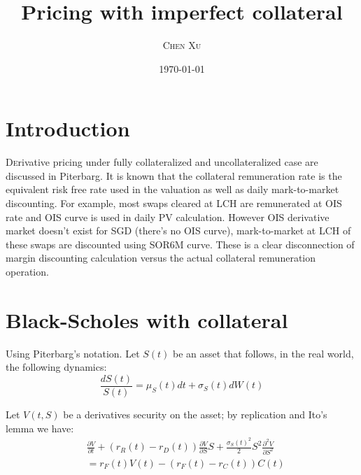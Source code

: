 \documentclass[twoside,twocolumn]{article}
\title{Pricing with imperfect collateral} %
\author{%
\textsc{Chen Xu} \\%
\normalsize %
}
\date{\today} %
\begin{document}
\maketitle


\section{Introduction}

\lettrine[nindent=0em,lines=3]{D}erivative pricing under fully collateralized and uncollateralized case are discussed in Piterbarg\cite{Piterbarg:2010}. It is known that the collateral remuneration rate is the equivalent risk free rate used in the valuation as well as daily mark-to-market discounting. For example, most swaps cleared at LCH are remunerated at OIS rate and OIS curve is used in daily PV calculation. However OIS derivative market doesn't exist for SGD (there's no OIS curve), mark-to-market at LCH of these swaps are discounted using SOR6M curve. These is a clear disconnection of margin discounting calculation versus the actual collateral remuneration operation. 




\section{Black-Scholes with collateral}

Using Piterbarg\cite{Piterbarg:2010}'s notation. Let $S(t)$ be an asset that follows, in the real world, the following dynamics:
\begin{equation}
\frac{dS(t)}{S(t)}= \mu_{S}(t)dt+\sigma_{S}(t)dW(t) \nonumber
\end{equation}

Let $V(t, S)$ be a derivatives security on the asset; by replication and Ito's lemma we have:
\begin{align*}
&\frac{\partial V}{\partial t} + (r_{R}(t)-r_{D}(t))\frac{\partial V}{\partial S}S + \frac{\sigma_{S}(t)^2}{2}S^2\frac{\partial^2 V}{\partial S^2}\\
&= r_{F}(t)V(t) - (r_{F}(t) - r_{C}(t))C(t)
\end{align*}
\end{document}
